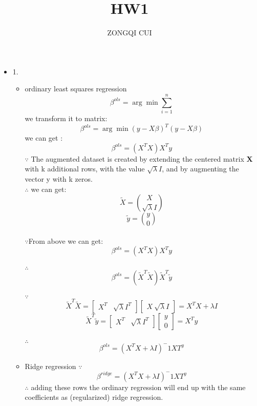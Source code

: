 \documentclass[10pt,letterpaper]{article}
\title{HW1}
\author{ZONGQI CUI}
\begin{document}
\maketitle
\begin{itemize}
    \item {1.}
        \begin{itemize}
            \item {ordinary least squares regression}
                \[\beta^{ols} = \arg\min\sum_{i=1}^{n}  \]
                we transform it to matrix:
                \[\beta^{ols} = \arg\min(y-X \beta )^T(y-X \beta ) \]
                we can get :
                \[\beta^{ols} =(X^TX)X^Ty\]
                $\because$ The augmented dataset is created by extending the centered matrix \textbf{X} with k additional rows, with the value  $\sqrt{\lambda }I$, and by augmenting the vector
                y with k zeros.\\
                $\therefore $ we can get:
                    \[\tilde{X} =\binom{X}{\sqrt{\lambda }I} \]
                    \[\tilde{y} =\binom{y}{0} \]\\
                $\because$From above we can get:\[\beta^{ols} =(X^TX)X^Ty\]\\
                $\therefore$
                \[\beta^{ols} =(\tilde{X}^T\tilde{X})\tilde{X}^T\tilde{y}\]\\
                $\because$
                \[\tilde{X}^T \tilde{X} = \begin{bmatrix} X^T & \sqrt{\lambda}I^T \end{bmatrix}\begin{bmatrix} X \ \sqrt{\lambda}I \end{bmatrix} = X^TX + \lambda I \]
                \[\tilde{X}^T\tilde{y}=\begin{bmatrix}
                    X^T & \sqrt{\lambda}I^T
                \end{bmatrix}
                \begin{bmatrix}
                    y \\
                    0
                \end{bmatrix}=
                X^Ty\]\\
                $\therefore$
                \[\beta^{ols}=(X^TX+\lambda I)^-1XT^y\]
            \item {Ridge regression}
                $\because$
                \[\beta^{ridge}=(X^TX+\lambda I)^-1XT^y\]
                $\therefore$
                adding these rows the ordinary regression will end up with the same coefficients as (regularized) ridge regression.

\end{itemize}
\end{itemize}
\end{document}
